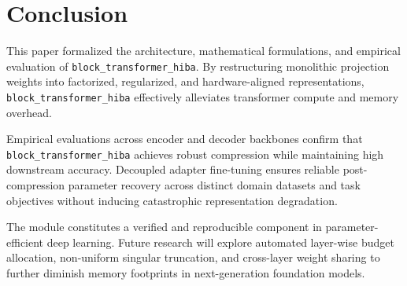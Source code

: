 \section{Conclusion}
This paper formalized the architecture, mathematical formulations, and empirical evaluation of \texttt{block\_transformer\_hiba}. By restructuring monolithic projection weights into factorized, regularized, and hardware-aligned representations, \texttt{block\_transformer\_hiba} effectively alleviates transformer compute and memory overhead.

Empirical evaluations across encoder and decoder backbones confirm that \texttt{block\_transformer\_hiba} achieves robust compression while maintaining high downstream accuracy. Decoupled adapter fine-tuning ensures reliable post-compression parameter recovery across distinct domain datasets and task objectives without inducing catastrophic representation degradation.

The module constitutes a verified and reproducible component in parameter-efficient deep learning. Future research will explore automated layer-wise budget allocation, non-uniform singular truncation, and cross-layer weight sharing to further diminish memory footprints in next-generation foundation models.
